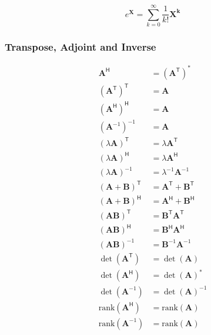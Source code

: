 \newpar{}
\begin{equation*}
    e^{\mathbf{X}} = \sum_{k=0}^{\infty}\frac{1}{k!}\mathbf{X^k}
\end{equation*}

\subsubsection{Transpose, Adjoint and Inverse}
\noindent\begin{align*}
    \mathbf{A}^\mathsf{H}                  & = {(\mathbf{A}^\mathsf{T})}^*                   \\[.75em]
    {({\mathbf{A}}^\mathsf{T})}^\mathsf{T} & = \mathbf{A}                                    \\
    {({\mathbf{A}}^\mathsf{H})}^\mathsf{H} & = \mathbf{A}                                    \\
    {({\mathbf{A}}^{-1})}^{-1}             & = \mathbf{A}                                    \\[.75em]
    {(\lambda\mathbf{A})}^\mathsf{T}       & = \lambda\mathbf{A}^\mathsf{T}                  \\
    {(\lambda\mathbf{A})}^\mathsf{H}       & = \lambda\mathbf{A}^\mathsf{H}                  \\
    {(\lambda\mathbf{A})}^{-1}             & = \lambda^{-1}\mathbf{A}^{-1}                   \\[.75em]
    {(\mathbf{A}+\mathbf{B})}^\mathsf{T}   & = \mathbf{A}^\mathsf{T} + \mathbf{B}^\mathsf{T} \\
    {(\mathbf{A}+\mathbf{B})}^\mathsf{H}   & = \mathbf{A}^\mathsf{H} + \mathbf{B}^\mathsf{H} \\[.75em]
    {(\mathbf{A}\mathbf{B})}^\mathsf{T}    & = \mathbf{B}^\mathsf{T}\mathbf{A}^\mathsf{T}    \\
    {(\mathbf{A}\mathbf{B})}^\mathsf{H}    & = \mathbf{B}^\mathsf{H}\mathbf{A}^\mathsf{H}    \\
    {(\mathbf{A}\mathbf{B})}^{-1}          & = \mathbf{B}^{-1} \mathbf{A}^{-1}               \\[.75em]
    \det(\mathbf{A}^\mathsf{T})            & = \det(\mathbf{A})                              \\
    \det(\mathbf{A}^\mathsf{H})            & = {\det(\mathbf{A})}^*                          \\
    \det(\mathbf{A}^{-1})                  & = {\det(\mathbf{A})}^{-1}                       \\[.75em]
    \mathrm{rank}{(\mathbf{A}^\mathsf{H})} & = \mathrm{rank}(\mathbf{A})                     \\
    \mathrm{rank}{(\mathbf{A}^{-1} )}      & = \mathrm{rank}(\mathbf{A})
\end{align*}

